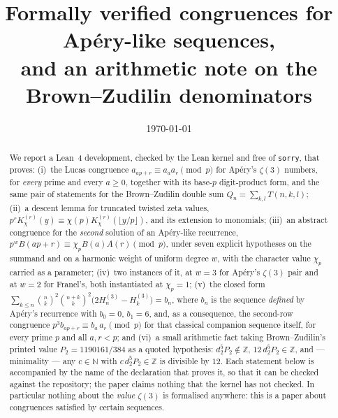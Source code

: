 \documentclass[11pt,reqno]{amsart}
\theoremstyle{plain}
\theoremstyle{definition}
\theoremstyle{remark}
\newcommand{\Z}{\mathbb{Z}}
\newcommand{\N}{\mathbb{N}}
\newcommand{\bin}[2]{\binom{#1}{#2}}
\newcommand{\HH}[2]{H^{(#1)}_{#2}}
\newcommand{\Ln}[1]{\texttt{#1}}
\numberwithin{equation}{section}
\begin{document}
\title[Formally verified congruences for Ap\'ery-like sequences]
      {Formally verified congruences for Ap\'ery-like sequences,\\
       and an arithmetic note on the Brown--Zudilin denominators}

\author{}

\date{\today}


\begin{abstract}
We report a Lean~4 development, checked by the Lean kernel and free of \Ln{sorry}, that
proves: (i)~the Lucas congruence $a_{ap+r}\equiv a_aa_r\pmod p$ for Ap\'ery's $\zeta(3)$
numbers, for \emph{every} prime and every $a\ge0$, together with its base-$p$ digit-product
form, and the same pair of statements for the Brown--Zudilin double sum
$Q_n=\sum_{k,l}T(n,k,l)$; (ii)~a descent lemma for truncated twisted zeta values,
$p^rK^{(r)}_\chi(y)\equiv\chi(p)K^{(r)}_\chi(\lfloor y/p\rfloor)$, and its extension to
monomials; (iii)~an abstract congruence for the \emph{second} solution of an
Ap\'ery-like recurrence, $p^wB(ap+r)\equiv\chi_pB(a)A(r)\pmod p$, under seven explicit
hypotheses on the summand and on a harmonic weight of uniform degree $w$, with the
character value $\chi_p$ carried as a parameter; (iv)~two instances of it, at $w=3$ for
Ap\'ery's $\zeta(3)$ pair and at $w=2$ for Franel's, both instantiated at $\chi_p=1$;
(v)~the closed form
$\sum_{k\le n}\bin nk^2\bin{n+k}k^2\bigl(2\HH3n-\HH3k\bigr)=b_n$, where $b_n$ is the sequence
\emph{defined} by Ap\'ery's recurrence with $b_0=0$, $b_1=6$, and, as a consequence, the
second-row congruence $p^3b_{ap+r}\equiv b_a\,a_r\pmod p$ for that classical companion
sequence itself, for every prime $p$ and all $a,r<p$; and (vi)~a small arithmetic fact taking
Brown--Zudilin's printed value $P_2=1190161/384$ as a quoted hypothesis: $d_2^5P_2\notin\Z$,
$12\,d_2^5P_2\in\Z$, and --- minimality --- any $c\in\N$ with $c\,d_2^5P_2\in\Z$ is divisible
by $12$. Each statement below is accompanied by the name of the declaration that proves it,
so that it can be checked against the repository; the paper claims nothing that the kernel
has not checked. In particular nothing about the \emph{value} $\zeta(3)$ is formalised
anywhere: this is a paper about congruences satisfied by certain sequences.
\end{abstract}

\maketitle
\end{document}
